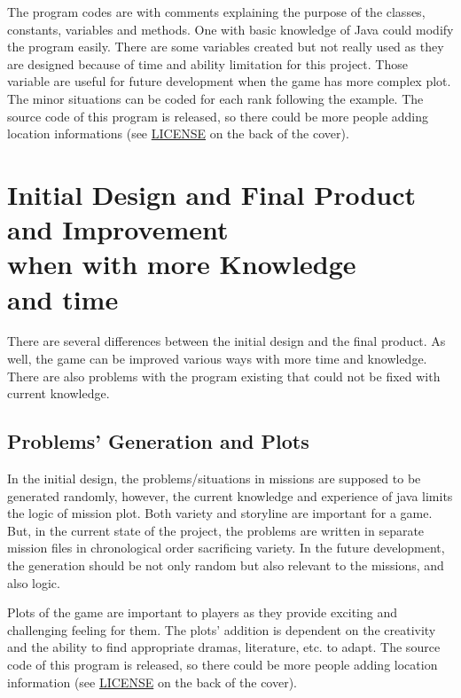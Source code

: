 \documentclass[letterpaper, 12pt]{report}
\begin{document}
The program codes are with comments explaining the purpose of the classes, constants, variables and methods. One with basic knowledge of Java could modify the program easily. There are some variables created but not really used as they are designed because of time and ability limitation for this project. Those variable are useful for future development when the game has more complex plot. The minor situations can be coded for each rank following the example. The source code of this program is released, so there could be more people adding location informations (see \hyperref[chap:LICENSE]{LICENSE} on the back of the cover).

\chapter{Initial Design and Final Product\\ and Improvement\\when with more Knowledge\\and time}
There are several differences between the initial design and the final product. As well, the game can be improved various ways with more time and knowledge. There are also problems with the program existing that could not be fixed with current knowledge.

\section{Problems' Generation and Plots}
In the initial design, the problems/situations in missions are supposed to be generated randomly, however, the current knowledge and experience of java limits the logic of mission plot. Both variety and storyline are important for a game. But, in the current state of the project, the problems are written in separate mission files in chronological order sacrificing variety. In the future development, the generation should be not only random but also relevant to the missions, and also logic.

Plots of the game are important to players as they provide exciting and challenging feeling for them. The plots' addition is dependent on the creativity and the ability to find appropriate dramas, literature, etc. to adapt. The source code of this program is released, so there could be more people adding location information (see \hyperref[chap:LICENSE]{LICENSE} on the back of the cover).
\end{document}
